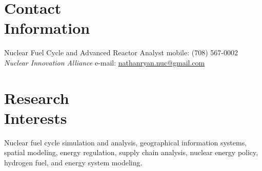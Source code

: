 \documentclass[margin,line]{resume}
\begin{document}
\begin{resume}

%


    \section{\mysidestyle Contact\\Information}
    Nuclear Fuel Cycle and Advanced Reactor Analyst \hfill mobile: (708) 567-0002 \vspace{0mm}\\\vspace{0mm}%
        \textsl{Nuclear Innovation Alliance}
        \hfill e-mail: \href{mailto:nathanryan.nuc@gmail.com}{nathanryan.nuc@gmail.com}       \vspace{0mm}\\\vspace{0mm}%

    \section{\mysidestyle Research\\Interests}
                Nuclear fuel cycle simulation and analysis, geographical information systems, spatial modeling, energy regulation, supply chain analysis, nuclear energy policy, hydrogen fuel, and energy system modeling.

\end{resume}
\end{document}
